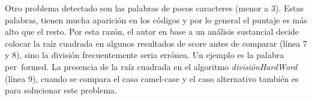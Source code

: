 \documentclass[a4paper,12pt]{report}
\begin{document}


Otro problema detectado son las palabras de pocos caracteres (menor a 3). Estas palabras, tienen mucha aparición en los códigos y por lo general el puntaje es más alto que el resto. Por esta razón, el autor \cite{EHPV09} en base a un análisis sustancial decide colocar la raíz cuadrada en algunos resultados de score antes de comparar (línea 7 y 8), sino la división frecuentemente seria errónea. Un ejemplo es la palabra \mbox{\textsf{per formed}}. La presencia de la raíz cuadrada en el algoritmo \textit{divisiónHardWord} (línea 9), cuando se compara el caso camel-case y el caso alternativo también es para solucionar este problema.\\
\end{document}
